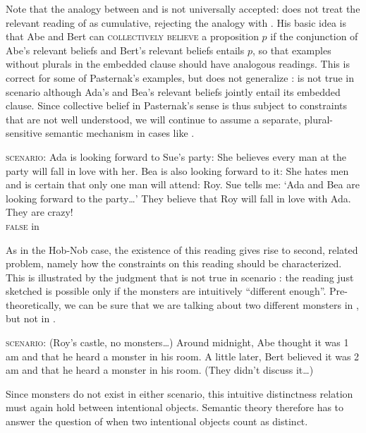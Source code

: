 \documentclass[output=paper]{langscibook}
\begin{document}
\noindent Note that the analogy between  and  is not universally accepted: \citet{Pasternak:2018a} does not treat the relevant reading of  as cumulative, rejecting the analogy with . His basic idea is that Abe and Bert can \textsc{collectively believe} a proposition $p$ if the conjunction of Abe's relevant beliefs and Bert's relevant beliefs entails $p$, so that examples without plurals in the embedded clause should have analogous readings. This is correct for some of Pasternak's examples, but does not generalize \citep{Marty:2019, Schmitt:2019a}:  is not true in scenario  although Ada's and Bea's relevant beliefs jointly entail its embedded clause. Since collective belief in Pasternak's sense is thus subject to constraints that are not well understood, we will continue to assume a separate, plural-sensitive semantic mechanism in cases like .

\eanoraggedright
\eanoraggedright \label{sch-has:ex:fn1} \textsc{scenario}: Ada is looking forward to Sue's party: She believes every man at the party will fall in love with her. Bea is also looking forward to it: She hates men and is certain that only one man will attend: Roy. Sue tells me: `Ada and Bea are looking forward to the party\ldots'
\ex \label{sch-has:ex:fn2} They believe that Roy will fall in love with Ada. They are crazy! \\
\null \hfill \textsc{false} in 
\z\z

\noindent As in the Hob-Nob case, the existence of this reading gives rise to second, related problem, namely how the constraints on this reading should be characterized. This is illustrated by the judgment that  is not true in scenario : the reading just sketched is possible only if the monsters are intuitively ``different enough''. Pre-theoretically, we can be sure that we are talking about two different monsters in , but not in . 

\eanoraggedright\label{sch-has:ex:8} \textsc{scenario:}   (Roy's castle, no monsters\ldots) Around midnight, Abe thought it was 1 am and that he heard a monster in his room. A little later, Bert believed it was 2 am and that he heard a monster in his room. (They didn't discuss it\ldots) \z

\noindent Since monsters do not exist in either scenario, this intuitive distinctness relation must again hold between intentional objects.  Semantic theory therefore has to answer the question of when two intentional objects count as distinct.
\end{document}
